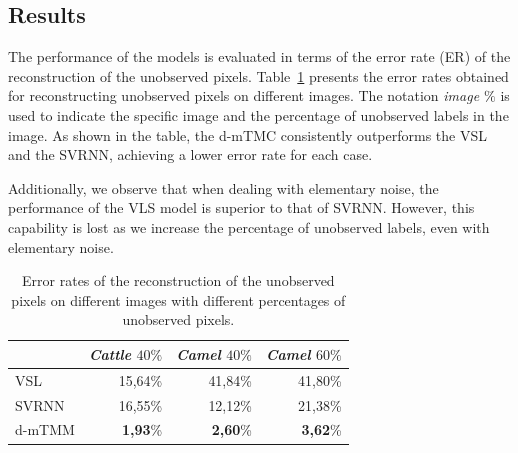 \documentclass{article}
\begin{document}
\subsection{Results}
\label{subsec:results}
The performance of the models is evaluated in terms of
the error rate (ER) of the reconstruction of the unobserved pixels.  
Table~\ref{tab:error_rates} presents the error rates obtained for reconstructing unobserved pixels on different images. The notation \textit{image $\%$} is used to indicate the specific image and the percentage of unobserved labels in the image. 
As shown in the table, the d-mTMC consistently outperforms the VSL and the SVRNN, achieving a lower error rate for each case. 

Additionally, we observe that when dealing with elementary noise, the performance of the VLS model is superior to that of SVRNN. However, this capability is lost as we increase the percentage of unobserved labels, even with elementary noise.
\begin{table}[htb]
\centering
\begin{tabular}{l|r|r|l|}
\cline{2-4}
                            & \multicolumn{1}{l|}{\textit{Cattle} $40\%$} & \multicolumn{1}{l|}{\textit{Camel} $40\%$} & \textit{Camel} $60\%$                      \\ \hline
\multicolumn{1}{|l|}{VSL}   & 15,64\%                    & 41,84\%                      & \multicolumn{1}{r|}{41,80\%} \\ \hline
\multicolumn{1}{|l|}{SVRNN} & 16,55\%                    & 12,12\%                      & \multicolumn{1}{r|}{  21,38\%}                            \\ \hline
\multicolumn{1}{|l|}{d-mTMM}   & \textbf{1,93}\%                     &\textbf{ 2,60}\%                       & \multicolumn{1}{r|}{\textbf{3,62}\%}  \\ \hline
\end{tabular}
\caption{Error rates of the reconstruction of the unobserved pixels on different images with different percentages of unobserved pixels.}
\label{tab:error_rates}
\end{table}
\end{document}
